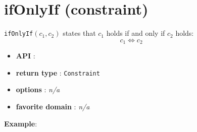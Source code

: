 \label{ifonlyif}
\hypertarget{ifonlyif}{}

\section{ifOnlyIf (constraint)}\label{ifonlyif:ifonlyifconstraint}\hypertarget{ifonlyif:ifonlyifconstraint}{}
\begin{notedef}
  \texttt{ifOnlyIf}$(c_1,c_2)$ states that $c_1$ holds if and only if $c_2$ holds:
$$c_1\iff c_2$$
\end{notedef}

\begin{itemize}
	\item \textbf{API} : 
	\item \textbf{return type} : \texttt{Constraint}
	\item \textbf{options} : \emph{n/a}
	\item \textbf{favorite domain} : \emph{n/a}
\end{itemize}

\textbf{Example}:

